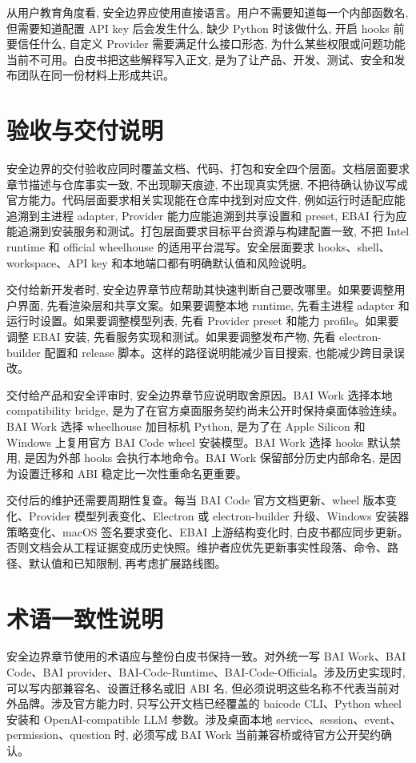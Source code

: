 从用户教育角度看, 安全边界应使用直接语言。用户不需要知道每一个内部函数名, 但需要知道配置 API key 后会发生什么, 缺少 Python 时该做什么, 开启 hooks 前要信任什么, 自定义 Provider 需要满足什么接口形态, 为什么某些权限或问题功能当前不可用。白皮书把这些解释写入正文, 是为了让产品、开发、测试、安全和发布团队在同一份材料上形成共识。

\section{验收与交付说明}
安全边界的交付验收应同时覆盖文档、代码、打包和安全四个层面。文档层面要求章节描述与仓库事实一致, 不出现聊天痕迹, 不出现真实凭据, 不把待确认协议写成官方能力。代码层面要求相关实现能在仓库中找到对应文件, 例如运行时适配应能追溯到主进程 adapter, Provider 能力应能追溯到共享设置和 preset, EBAI 行为应能追溯到安装服务和测试。打包层面要求目标平台资源与构建配置一致, 不把 Intel runtime 和 official wheelhouse 的适用平台混写。安全层面要求 hooks、shell、workspace、API key 和本地端口都有明确默认值和风险说明。

交付给新开发者时, 安全边界章节应帮助其快速判断自己要改哪里。如果要调整用户界面, 先看渲染层和共享文案。如果要调整本地 runtime, 先看主进程 adapter 和运行时设置。如果要调整模型列表, 先看 Provider preset 和能力 profile。如果要调整 EBAI 安装, 先看服务实现和测试。如果要调整发布产物, 先看 electron-builder 配置和 release 脚本。这样的路径说明能减少盲目搜索, 也能减少跨目录误改。

交付给产品和安全评审时, 安全边界章节应说明取舍原因。BAI Work 选择本地 compatibility bridge, 是为了在官方桌面服务契约尚未公开时保持桌面体验连续。BAI Work 选择 wheelhouse 加目标机 Python, 是为了在 Apple Silicon 和 Windows 上复用官方 BAI Code wheel 安装模型。BAI Work 选择 hooks 默认禁用, 是因为外部 hooks 会执行本地命令。BAI Work 保留部分历史内部命名, 是因为设置迁移和 ABI 稳定比一次性重命名更重要。

交付后的维护还需要周期性复查。每当 BAI Code 官方文档更新、wheel 版本变化、Provider 模型列表变化、Electron 或 electron-builder 升级、Windows 安装器策略变化、macOS 签名要求变化、EBAI 上游结构变化时, 白皮书都应同步更新。否则文档会从工程证据变成历史快照。维护者应优先更新事实性段落、命令、路径、默认值和已知限制, 再考虑扩展路线图。

\section{术语一致性说明}
安全边界章节使用的术语应与整份白皮书保持一致。对外统一写 BAI Work、BAI Code、BAI provider、BAI-Code-Runtime、BAI-Code-Official。涉及历史实现时, 可以写内部兼容名、设置迁移名或旧 ABI 名, 但必须说明这些名称不代表当前对外品牌。涉及官方能力时, 只写公开文档已经覆盖的 baicode CLI、Python wheel 安装和 OpenAI-compatible LLM 参数。涉及桌面本地 service、session、event、permission、question 时, 必须写成 BAI Work 当前兼容桥或待官方公开契约确认。

